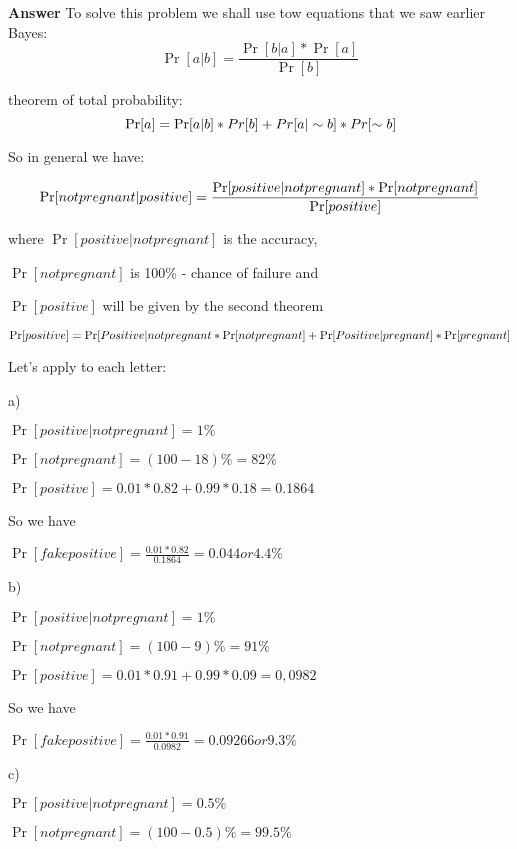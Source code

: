 \documentclass{book} %
\begin{document}
\textbf{Answer}
To solve this problem we shall use tow equations that we saw earlier
\large{Bayes: }
\begin{equation*}
 \Pr[a|b]=\frac{\Pr[b|a]*\Pr[a]}{\Pr[b]}
\end{equation*}


 \large{theorem of total probability:}
\begin{equation*}
    \\ \Pr[a]=\Pr[a|b]*Pr[b]+Pr[a|\sim b]*Pr[\sim b]
\end{equation*}

So in general we have:

\begin{equation*}
    \large{\Pr[not pregnant| positive]=\frac{\Pr[positive|not pregnant]*\Pr[not pregnant]}{\Pr[positive]}}
\end{equation*}

where $\Pr[positive|not pregnant]$  is  the  accuracy,

$\Pr[not pregnant]$ is 100\% - chance of failure and 

$\Pr[positive]$ will be given by the second theorem

\begin{equation*}
\large{\Pr[positive]=\Pr[Positive|not pregnant}*\Pr[not pregnant]+\Pr[Positive|pregnant]*\Pr[pregnant]    
\end{equation*}

Let's apply to each letter:

a)

$\Pr[positive|not pregnant] = 1\%$

$\Pr[not pregnant]= (100-18)\%=82\%$

$\Pr[positive]=0.01*0.82+0.99*0.18=0.1864$

So we have

$\Pr[fake positive] = \frac{0.01*0.82}{0.1864}=0.044 or 4.4\%$


b)

$\Pr[positive|not pregnant] = 1\%$

$\Pr[not pregnant]= (100-9)\%=91\%$

$\Pr[positive]=0.01*0.91+0.99*0.09=0,0982$

So we have

$\Pr[fake positive] = \frac{0.01*0.91}{0.0982}=0.09266 or 9.3\%$

c)

$\Pr[positive|not pregnant] = 0.5\%$

$\Pr[not pregnant]= (100-0.5)\%=99.5\%$
\end{document}
